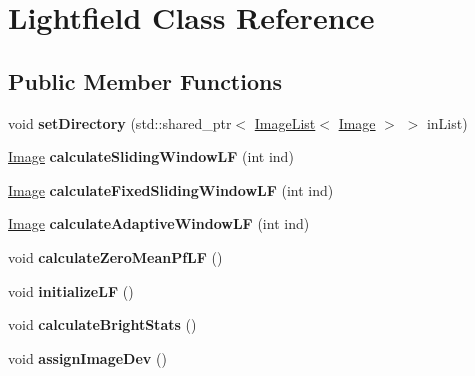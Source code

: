 \hypertarget{classLightfield}{}\section{Lightfield Class Reference}
\label{classLightfield}
\subsection*{Public Member Functions}
\begin{DoxyCompactItemize}
\item 
void {\bfseries set\+Directory} (std\+::shared\+\_\+ptr$<$ \hyperlink{classImageList}{Image\+List}$<$ \hyperlink{classImage}{Image} $>$ $>$ in\+List)\hypertarget{classLightfield_a9f85ec2466de24a6846de0a93fe8e570}{}\label{classLightfield_a9f85ec2466de24a6846de0a93fe8e570}

\item 
\hyperlink{classImage}{Image} {\bfseries calculate\+Sliding\+Window\+LF} (int ind)\hypertarget{classLightfield_a00541cb8a4280ebf724aac202fb6d389}{}\label{classLightfield_a00541cb8a4280ebf724aac202fb6d389}

\item 
\hyperlink{classImage}{Image} {\bfseries calculate\+Fixed\+Sliding\+Window\+LF} (int ind)\hypertarget{classLightfield_ace1887a29a7e850ea3a162142f1768c3}{}\label{classLightfield_ace1887a29a7e850ea3a162142f1768c3}

\item 
\hyperlink{classImage}{Image} {\bfseries calculate\+Adaptive\+Window\+LF} (int ind)\hypertarget{classLightfield_a096deb07564b1fddff0d837f623e0288}{}\label{classLightfield_a096deb07564b1fddff0d837f623e0288}

\item 
void {\bfseries calculate\+Zero\+Mean\+Pf\+LF} ()\hypertarget{classLightfield_a42be1d3c9eca89f90a004d721475e388}{}\label{classLightfield_a42be1d3c9eca89f90a004d721475e388}

\item 
void {\bfseries initialize\+LF} ()\hypertarget{classLightfield_a06f1e802ec94f9fe4562b597e8de6442}{}\label{classLightfield_a06f1e802ec94f9fe4562b597e8de6442}

\item 
void {\bfseries calculate\+Bright\+Stats} ()\hypertarget{classLightfield_ada31f20ddaf91ba1b2bbd6fcfaa57558}{}\label{classLightfield_ada31f20ddaf91ba1b2bbd6fcfaa57558}

\item 
void {\bfseries assign\+Image\+Dev} ()\hypertarget{classLightfield_a2e2ce8efa2f7ae07155414f3cc1e1485}{}\label{classLightfield_a2e2ce8efa2f7ae07155414f3cc1e1485}


\end{DoxyCompactItemize}
